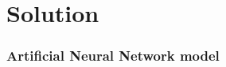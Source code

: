 \chapter{Solution}
\label{cha:solution}

\subsection{Artificial Neural Network model}
\label{subsec:artificial_neural_network_model}

\clearpage
